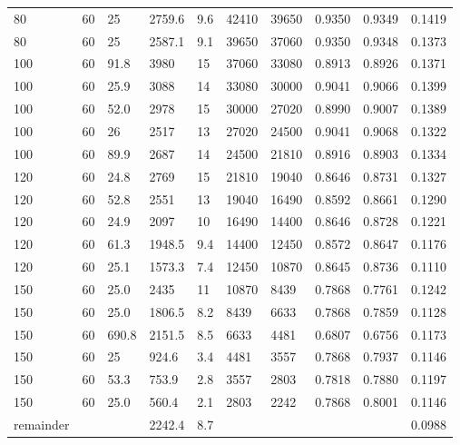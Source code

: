 \begin{chplandscape}
\begin{small}
\begin{longtable}{p{1.5cm}p{1.1cm}p{1.1cm}p{1.3cm}p{1.5cm}p{1.3cm}p{1.3cm}p{1.5cm}p{1.5cm}p{1.3cm}}
80 & 60 & 25 & 2759.6 & 9.6 & 42410 & 39650 & 0.9350 & 0.9349 & 0.1419 \\
80 & 60 & 25 & 2587.1 & 9.1 & 39650 & 37060 & 0.9350 & 0.9348 & 0.1373 \\
100 & 60 & 91.8 & 3980 & 15 & 37060 & 33080 & 0.8913 & 0.8926 & 0.1371 \\
100 & 60 & 25.9 & 3088 & 14 & 33080 & 30000 & 0.9041 & 0.9066 & 0.1399 \\
100 & 60 & 52.0 & 2978 & 15 & 30000 & 27020 & 0.8990 & 0.9007 & 0.1389 \\
100 & 60 & 26 & 2517 & 13 & 27020 & 24500 & 0.9041 & 0.9068 & 0.1322 \\
100 & 60 & 89.9 & 2687 & 14 & 24500 & 21810 & 0.8916 & 0.8903 & 0.1334 \\
120 & 60 & 24.8 & 2769 & 15 & 21810 & 19040 & 0.8646 & 0.8731 & 0.1327 \\
120 & 60 & 52.8 & 2551 & 13 & 19040 & 16490 & 0.8592 & 0.8661 & 0.1290 \\
120 & 60 & 24.9 & 2097 & 10 & 16490 & 14400 & 0.8646 & 0.8728 & 0.1221 \\
120 & 60 & 61.3 & 1948.5 & 9.4 & 14400 & 12450 & 0.8572 & 0.8647 & 0.1176 \\
120 & 60 & 25.1 & 1573.3 & 7.4 & 12450 & 10870 & 0.8645 & 0.8736 & 0.1110 \\
150 & 60 & 25.0 & 2435 & 11 & 10870 & 8439 & 0.7868 & 0.7761 & 0.1242 \\
150 & 60 & 25.0 & 1806.5 & 8.2 & 8439 & 6633 & 0.7868 & 0.7859 & 0.1128 \\
150 & 60 & 690.8 & 2151.5 & 8.5 & 6633 & 4481 & 0.6807 & 0.6756 & 0.1173 \\
150 & 60 & 25 & 924.6 & 3.4 & 4481 & 3557 & 0.7868 & 0.7937 & 0.1146 \\
150 & 60 & 53.3 & 753.9 & 2.8 & 3557 & 2803 & 0.7818 & 0.7880 & 0.1197 \\
150 & 60 & 25.0 & 560.4 & 2.1 & 2803 & 2242 & 0.7868 & 0.8001 & 0.1146 \\
remainder &  &  & 2242.4 & 8.7 &  &  &  &  & 0.0988 \\
\end{longtable}
\end{small}
\end{chplandscape}

